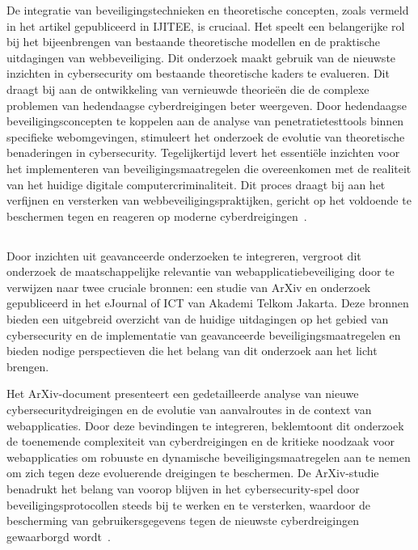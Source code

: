 De integratie van beveiligingstechnieken en theoretische concepten, zoals vermeld in het artikel gepubliceerd in IJITEE, is cruciaal. Het speelt een belangerijke rol 
bij het bijeenbrengen van bestaande theoretische modellen en de praktische uitdagingen van webbeveiliging. Dit onderzoek maakt gebruik van de nieuwste inzichten in cybersecurity 
om bestaande theoretische kaders te evalueren. Dit draagt bij aan de ontwikkeling van vernieuwde theorieën die de complexe problemen van hedendaagse 
cyberdreigingen beter weergeven. Door hedendaagse beveiligingsconcepten te koppelen aan de analyse van penetratietesttools binnen specifieke webomgevingen, 
stimuleert het onderzoek de evolutie van theoretische benaderingen in cybersecurity. Tegelijkertijd levert het essentiële inzichten voor het implementeren van beveiligingsmaatregelen
die overeenkomen met de realiteit van het huidige digitale computercriminaliteit.
Dit proces draagt bij aan het verfijnen en versterken van webbeveiligingspraktijken, gericht op het voldoende te beschermen tegen en reageren op moderne 
cyberdreigingen~\autocite{Nagendran2019}.

\subsection{}
Door inzichten uit geavanceerde onderzoeken te integreren, vergroot dit onderzoek de maatschappelijke relevantie van webapplicatiebeveiliging door te verwijzen naar 
twee cruciale bronnen: een studie van ArXiv en onderzoek gepubliceerd in het eJournal of ICT van Akademi Telkom Jakarta. Deze bronnen bieden een uitgebreid overzicht 
van de huidige uitdagingen op het gebied van cybersecurity en de implementatie van geavanceerde beveiligingsmaatregelen en bieden nodige perspectieven die het 
belang van dit onderzoek aan het licht brengen.

Het ArXiv-document presenteert een gedetailleerde analyse van nieuwe cybersecuritydreigingen en de evolutie van aanvalroutes in de context van webapplicaties. 
Door deze bevindingen te integreren, beklemtoont dit onderzoek de toenemende complexiteit van cyberdreigingen en de kritieke noodzaak voor webapplicaties om robuuste 
en dynamische beveiligingsmaatregelen aan te nemen om zich tegen deze evoluerende dreigingen te beschermen. De ArXiv-studie benadrukt het belang van voorop blijven 
in het cybersecurity-spel door beveiligingsprotocollen steeds bij te werken en te versterken, waardoor de bescherming van gebruikersgegevens tegen de nieuwste 
cyberdreigingen gewaarborgd wordt~\autocite{Deng2023}.

